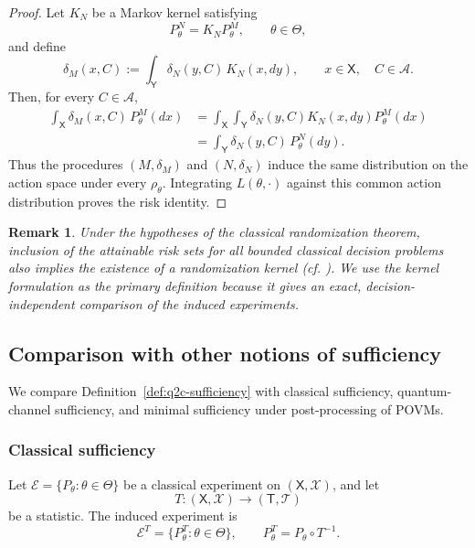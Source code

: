 \documentclass{article}
\newtheorem{remark}{Remark}
\theoremstyle{named}
\theoremstyle{named1}
\newcommand{\cE}{\mathcal{E}}
\theoremstyle{plain}
\theoremstyle{remark}
\begin{document}
\begin{proof}
Let $K_N$ be a Markov kernel satisfying
\[
    P_\theta^N=K_NP_\theta^M,
    \qquad \theta\in\Theta,
\]
and define
\[
    \delta_M(x,C)
    :=
    \int_{\mathsf Y}\delta_N(y,C)\,K_N(x,dy),
    \qquad
    x\in\mathsf X,\quad C\in\mathcal A.
\]
Then, for every $C\in\mathcal A$,
\[
\begin{aligned}
    \int_{\mathsf X}\delta_M(x,C)\,P_\theta^M(dx)
    &=
    \int_{\mathsf X}\int_{\mathsf Y}
    \delta_N(y,C)K_N(x,dy)P_\theta^M(dx)\\
    &=
    \int_{\mathsf Y}\delta_N(y,C)\,P_\theta^N(dy).
\end{aligned}
\]
Thus the procedures $(M,\delta_M)$ and $(N,\delta_N)$ induce the same
distribution on the action space under every $\rho_\theta$. Integrating
$L(\theta,\cdot)$ against this common action distribution proves the risk
identity.
\end{proof}

\begin{remark}
\label{rem:randomization-converse}
Under the hypotheses of the classical randomization theorem, inclusion of
the attainable risk sets for all bounded classical decision problems also
implies the existence of a randomization kernel (cf. \cite{LeCam1996}). We use the kernel
formulation as the primary definition because it gives an exact,
decision-independent comparison of the induced experiments.
\end{remark}

\subsection{Comparison with other notions of sufficiency}
\label{subsec:comparison-sufficiency}

We compare Definition~\ref{def:q2c-sufficiency} with classical
sufficiency, quantum-channel sufficiency, and minimal sufficiency
under post-processing of POVMs.


\subsubsection{Classical sufficiency}

Let $\cE=\{P_\theta:\theta\in\Theta\}$ be a classical experiment on
$(\mathsf X,\mathcal X)$, and let
\[
    T:(\mathsf X,\mathcal X)\rightarrow(\mathsf T,\mathcal T)
\]
be a statistic. The induced experiment is
\[
    \cE^T=\{P_\theta^T:\theta\in\Theta\},
    \qquad
    P_\theta^T=P_\theta\circ T^{-1}.
\]
\end{document}
